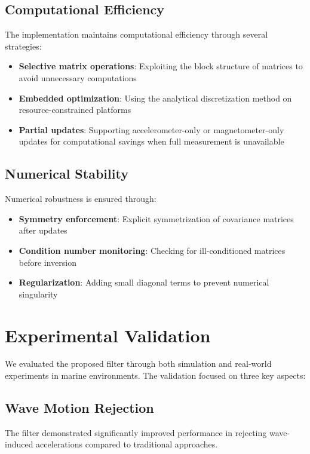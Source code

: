 \documentclass[11pt,letterpaper]{article}
\begin{document}
\subsection{Computational Efficiency}

The implementation maintains computational efficiency through several strategies:
\begin{itemize}
\item \textbf{Selective matrix operations}: Exploiting the block structure of matrices to avoid unnecessary computations
\item \textbf{Embedded optimization}: Using the analytical discretization method on resource-constrained platforms
\item \textbf{Partial updates}: Supporting accelerometer-only or magnetometer-only updates for computational savings when full measurement is unavailable
\end{itemize}

\subsection{Numerical Stability}

Numerical robustness is ensured through:
\begin{itemize}
\item \textbf{Symmetry enforcement}: Explicit symmetrization of covariance matrices after updates
\item \textbf{Condition number monitoring}: Checking for ill-conditioned matrices before inversion
\item \textbf{Regularization}: Adding small diagonal terms to prevent numerical singularity
\end{itemize}

\section{Experimental Validation}
\label{sec:validation}

We evaluated the proposed filter through both simulation and real-world experiments in marine environments. The validation focused on three key aspects:

\subsection{Wave Motion Rejection}

The filter demonstrated significantly improved performance in rejecting wave-induced accelerations compared to traditional approaches. 
\end{document}
